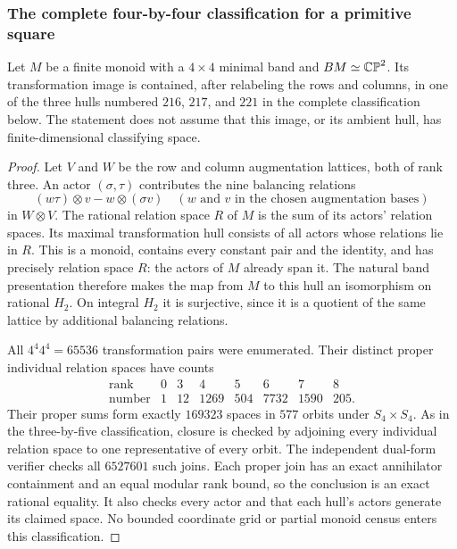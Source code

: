 \subsubsection{The complete four-by-four classification for a primitive square}

\begin{proposition}\label{B:four-by-four-CP2-hulls}
Let $M$ be a finite monoid with a $4\times4$ minimal band and
$BM\simeq\mathbb {CP}^2$.  Its transformation image is contained, after
relabeling the rows and columns, in one of the three hulls numbered
$216$, $217$, and $221$ in the complete classification below.
The statement does not assume that this image, or its ambient hull,
has finite-dimensional classifying space.
\end{proposition}

\begin{proof}
Let $V$ and $W$ be the row and column augmentation lattices, both
of rank three.  An actor $(\sigma,\tau)$ contributes the nine
balancing relations
\[
 (w\tau)\otimes v-w\otimes(\sigma v)
 \quad(w\text{ and }v\text{ in the chosen augmentation bases})
\]
in $W\otimes V$.  The rational relation space $R$ of $M$ is the
sum of its actors' relation spaces.  Its maximal transformation
hull consists of all actors whose relations lie in $R$.
This is a monoid, contains every constant pair and the identity,
and has precisely relation space $R$: the actors of $M$ already
span it.  The natural band presentation therefore makes the map
from $M$ to this hull an isomorphism on rational $H_2$.
On integral $H_2$ it is surjective, since it is a quotient of the
same lattice by additional balancing relations.

All $4^4 4^4=65536$ transformation pairs were enumerated.
Their distinct proper individual relation spaces have counts
\[
\begin{array}{c|rrrrrrr}
\text{rank}&0&3&4&5&6&7&8\\\hline
\text{number}&1&12&1269&504&7732&1590&205.
\end{array}
\]
Their proper sums form exactly $169323$ spaces in $577$ orbits
under $S_4\times S_4$.  As in the three-by-five classification,
closure is checked by adjoining every individual relation space to
one representative of every orbit.  The independent dual-form
verifier checks all $6527601$ such joins.  Each proper join has
an exact annihilator containment and an equal modular rank bound,
so the conclusion is an exact rational equality.  It also checks
every actor and that each hull's actors generate its claimed space.
No bounded coordinate grid or partial monoid census enters this
classification.


\end{proof}
